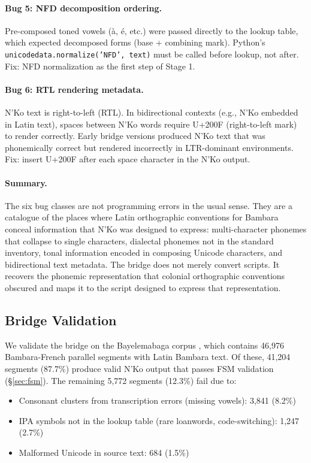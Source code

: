 \documentclass[11pt]{article}
\begin{document}
\paragraph{Bug 5: NFD decomposition ordering.}
Pre-composed toned vowels (\`{a}, \'{e}, etc.) were passed directly to the lookup table, which expected decomposed forms (base + combining mark).
Python's \texttt{unicodedata.normalize('NFD', text)} must be called before lookup, not after.
Fix: NFD normalization as the first step of Stage 1.

\paragraph{Bug 6: RTL rendering metadata.}
N'Ko text is right-to-left (RTL).
In bidirectional contexts (e.g., N'Ko embedded in Latin text), spaces between N'Ko words require U+200F (right-to-left mark) to render correctly.
Early bridge versions produced N'Ko text that was phonemically correct but rendered incorrectly in LTR-dominant environments.
Fix: insert U+200F after each space character in the N'Ko output.

\paragraph{Summary.}
The six bug classes are not programming errors in the usual sense.
They are a catalogue of the places where Latin orthographic conventions for Bambara conceal information that N'Ko was designed to express: multi-character phonemes that collapse to single characters, dialectal phonemes not in the standard inventory, tonal information encoded in composing Unicode characters, and bidirectional text metadata.
The bridge does not merely convert scripts.
It recovers the phonemic representation that colonial orthographic conventions obscured and maps it to the script designed to express that representation.

\subsection{Bridge Validation}

We validate the bridge on the Bayelemabaga corpus \cite{bayelemabaga2025}, which contains 46,976 Bambara-French parallel segments with Latin Bambara text.
Of these, 41,204 segments (87.7\%) produce valid N'Ko output that passes FSM validation (\S\ref{sec:fsm}).
The remaining 5,772 segments (12.3\%) fail due to:
\begin{itemize}
\item Consonant clusters from transcription errors (missing vowels): 3,841 (8.2\%)
\item IPA symbols not in the lookup table (rare loanwords, code-switching): 1,247 (2.7\%)
\item Malformed Unicode in source text: 684 (1.5\%)
\end{itemize}
\end{document}
